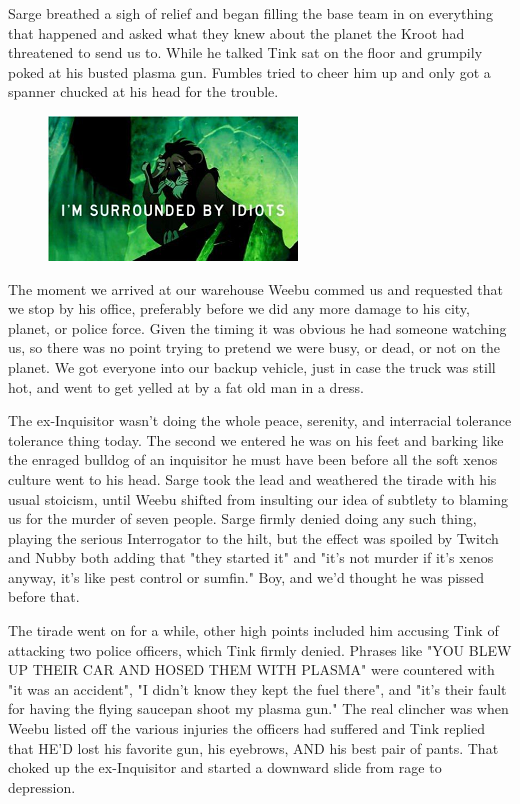 Sarge breathed a sigh of relief and began filling the base team in on everything that happened and asked what they knew about the planet the Kroot had threatened to send us to. 
While he talked Tink sat on the floor and grumpily poked at his busted plasma gun. 
Fumbles tried to cheer him up and only got a spanner chucked at his head for the trouble.

\begin{figure}
	\begin{center}
		\includegraphics[width=\figwidth]{pics/10/30.png}
	\end{center}
\end{figure}
The moment we arrived at our warehouse Weebu commed us and requested that we stop by his office, preferably before we did any more damage to his city, planet, or police force. 
Given the timing it was obvious he had someone watching us, so there was no point trying to pretend we were busy, or dead, or not on the planet. 
We got everyone into our backup vehicle, just in case the truck was still hot, and went to get yelled at by a fat old man in a dress.

The ex-Inquisitor wasn't doing the whole peace, serenity, and interracial tolerance tolerance thing today. 
The second we entered he was on his feet and barking like the enraged bulldog of an inquisitor he must have been before all the soft xenos culture went to his head. 
Sarge took the lead and weathered the tirade with his usual stoicism, until Weebu shifted from insulting our idea of subtlety to blaming us for the murder of seven people. 
Sarge firmly denied doing any such thing, playing the serious Interrogator to the hilt, but the effect was spoiled by Twitch and Nubby both adding that "they started it" and "it's not murder if it's xenos anyway, it's like pest control or sumfin." Boy, and we'd thought he was pissed before that.

The tirade went on for a while, other high points included him accusing Tink of attacking two police officers, which Tink firmly denied. 
Phrases like "YOU BLEW UP THEIR CAR AND HOSED THEM WITH PLASMA" were countered with "it was an accident", "I didn't know they kept the fuel there", and "it's their fault for having the flying saucepan shoot my plasma gun." The real clincher was when Weebu listed off the various injuries the officers had suffered and Tink replied that HE'D lost his favorite gun, his eyebrows, AND his best pair of pants. 
That choked up the ex-Inquisitor and started a downward slide from rage to depression.

